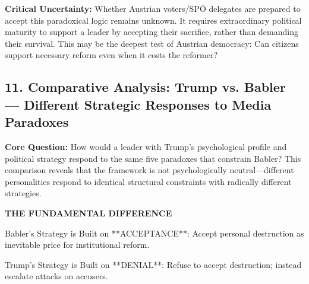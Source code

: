 \textbf{Critical Uncertainty:} Whether Austrian voters/SPÖ delegates are prepared to accept this paradoxical logic remains
unknown. It requires extraordinary political maturity to support a leader by accepting their sacrifice, rather than demanding
their survival. This may be the deepest test of Austrian democracy: Can citizens support necessary reform even when it costs
the reformer?

\vspace{1cm}

\label{sec:dx-comparative-trump-babler}

\subsection*{11. Comparative Analysis: Trump vs. Babler — Different Strategic Responses to Media Paradoxes}

\textbf{Core Question:} How would a leader with Trump's psychological profile and political strategy respond to the same
five paradoxes that constrain Babler? This comparison reveals that the framework is not psychologically neutral—different
personalities respond to identical structural constraints with radically different strategies.

\vspace{0.5cm}

\textbf{THE FUNDAMENTAL DIFFERENCE}

Babler's Strategy is Built on **ACCEPTANCE**: Accept personal destruction as inevitable price for institutional reform.

Trump's Strategy is Built on **DENIAL**: Refuse to accept destruction; instead escalate attacks on accusers.

